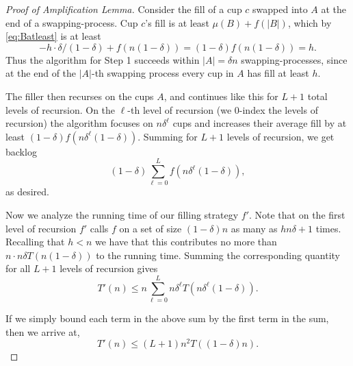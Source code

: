 \documentclass[twocolumn]{article}[10pt]
\begin{document}
\begin{proof}[Proof of Amplification Lemma]
  Consider the fill of a cup $c$ swapped into $A$ at the end of a swapping-process.
  Cup $c$'s fill is at least $\mu(B) + f(|B|)$, which by \eqref{eq:Batleast} is at least
  $$-h \cdot \delta/(1-\delta) + f(n (1-\delta)) = (1-\delta)f(n (1-\delta)) = h.$$
  Thus the algorithm for Step 1 succeeds within $|A| = \delta n$ swapping-processes, 
  since at the end of the $|A|$-th swapping process every cup in $A$ has fill at least $h$. 
  
  The filler then recurses on the cups $A$, and continues like this for $L + 1$ total 
  levels of recursion. On the $\ell$-th level of
  recursion (we $0$-index the levels of recursion) the algorithm focuses on $n\delta^{\ell}$ cups and increases their average fill by at least $(1-\delta)f(n\delta^\ell(1-\delta))$. Summing for
  $L+1$ levels of recursion, we get backlog 
  $$(1-\delta)\sum_{\ell=0}^L f(n\delta^\ell(1-\delta)),$$ 
  as desired.

  Now we analyze the running time of our filling strategy $f'$.
  Note that on the first level of recursion $f'$
  calls $f$ on a set of size $(1-\delta)n$ as many as $hn\delta +1$ times. 
  Recalling that $h < n$ we have that this contributes no more
  than $n\cdot n\delta T(n(1-\delta))$ to the running time. 
  Summing the corresponding quantity for all $L+1$ levels of recursion gives
  $$T'(n) \le n\sum_{\ell=0}^Ln\delta^\ell T(n\delta^\ell
  (1-\delta)). $$

  If we simply bound each term in the above sum by the first term in the sum, then we arrive at, 
  $$T'(n) \le (L+1) n^2 T((1-\delta)n).$$
\end{proof}
\end{document}

